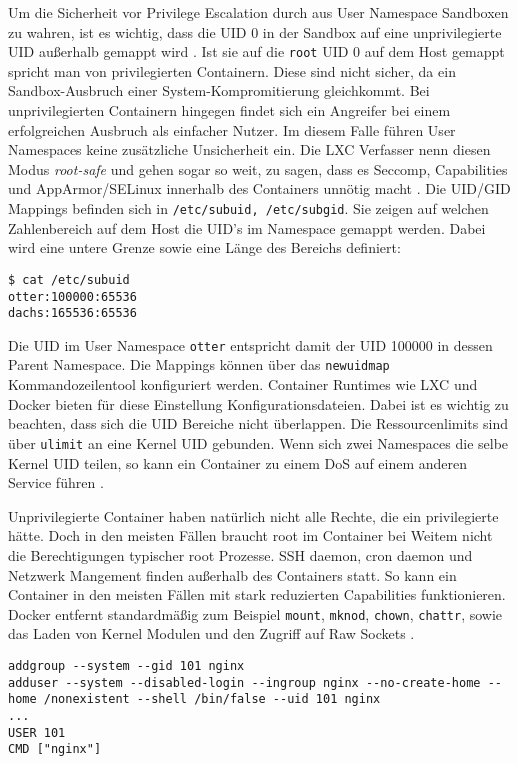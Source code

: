 Um die Sicherheit vor Privilege Escalation durch aus User Namespace Sandboxen zu wahren, ist es wichtig, dass die UID 0 in der Sandbox auf eine unprivilegierte UID außerhalb gemappt wird \cite{lxc-sec, stgraber-unpriv}. Ist sie auf die \texttt{root} UID 0 auf dem Host gemappt spricht man von privilegierten Containern. Diese sind nicht sicher, da ein Sandbox-Ausbruch einer System-Kompromitierung gleichkommt.
Bei unprivilegierten Containern hingegen findet sich ein Angreifer bei einem erfolgreichen Ausbruch als einfacher Nutzer. Im diesem Falle führen User Namespaces keine zusätzliche Unsicherheit ein. Die LXC Verfasser nenn diesen Modus \textit{root-safe} und gehen sogar so weit, zu sagen, dass es Seccomp, Capabilities und AppArmor/SELinux innerhalb des Containers unnötig macht \cite{lxc-sec}. Die UID/GID Mappings befinden sich in \texttt{/etc/subuid, /etc/subgid}. Sie zeigen auf welchen
Zahlenbereich auf dem Host die UID's im Namespace gemappt werden. Dabei wird eine untere Grenze sowie eine Länge des Bereichs definiert:

\begin{lstlisting}
$ cat /etc/subuid
otter:100000:65536
dachs:165536:65536
\end{lstlisting}

Die UID im User Namespace \texttt{otter} entspricht damit der UID 100000 in dessen Parent Namespace. Die Mappings können über das \texttt{newuidmap} Kommandozeilentool konfiguriert werden. Container Runtimes wie LXC und Docker bieten für diese Einstellung Konfigurationsdateien. Dabei ist es wichtig zu beachten, dass sich die UID Bereiche nicht überlappen. Die Ressourcenlimits sind über \texttt{ulimit} an eine Kernel UID gebunden. Wenn sich zwei Namespaces die selbe Kernel UID teilen,
so kann ein Container zu einem DoS auf einem anderen Service führen \cite{lxc-sec}.

Unprivilegierte Container haben natürlich nicht alle Rechte, die ein privilegierte hätte. Doch in den meisten Fällen braucht root im Container bei Weitem nicht die Berechtigungen typischer root Prozesse. SSH daemon, cron daemon und Netzwerk Mangement finden außerhalb des Containers statt. So kann ein Container in den meisten Fällen mit stark reduzierten Capabilities funktionieren. Docker entfernt standardmäßig zum Beispiel \texttt{mount}, \texttt{mknod}, \texttt{chown},
\texttt{chattr}, sowie das Laden von Kernel Modulen und den Zugriff auf Raw Sockets \cite{docker-sec}.

\begin{lstlisting}[caption={Ein Beispiel Dockerfile für einen NGINX Web Server der nicht als root im Container läuft}]
addgroup --system --gid 101 nginx 
adduser --system --disabled-login --ingroup nginx --no-create-home --home /nonexistent --shell /bin/false --uid 101 nginx
...
USER 101
CMD ["nginx"]
\end{lstlisting}

